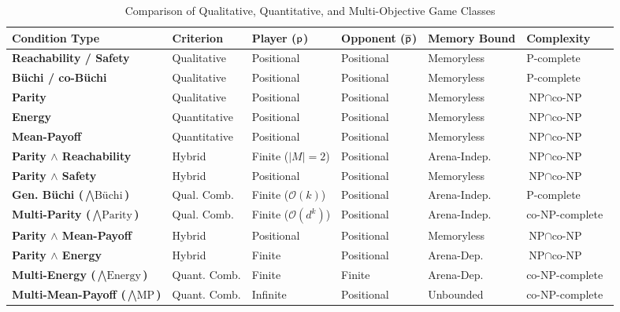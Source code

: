 \documentclass{article}
\begin{document}
\begin{table}[t]
\centering
\caption{Comparison of Qualitative, Quantitative, and Multi-Objective Game Classes}
\label{tab:game_conditions_comparison}
\small
\setlength{\tabcolsep}{1pt}
\begin{tabular}{@{}llllll@{}}
\toprule
\textbf{Condition Type} & \textbf{Criterion} & \textbf{Player ($\mathsf{p}$)} & \textbf{Opponent ($\overline{\mathsf{p}}$)} & \textbf{Memory Bound} & \textbf{Complexity} \\ 
\midrule
\textbf{Reachability / Safety} & Qualitative & Positional & Positional & Memoryless & $\text{P}$-complete \\
\textbf{Büchi / co-Büchi} & Qualitative & Positional & Positional & Memoryless & $\text{P}$-complete \\
\textbf{Parity} & Qualitative & Positional & Positional & Memoryless & $\text{NP} \cap \text{co-NP}$ \\
\textbf{Energy} & Quantitative & Positional & Positional & Memoryless & $\text{NP} \cap \text{co-NP}$~\cite{Chatterjee:2010EP} \\
\textbf{Mean-Payoff} & Quantitative & Positional & Positional & Memoryless & $\text{NP} \cap \text{co-NP}$~\cite{ChatterjeeHJ05} \\ 

\midrule
\textbf{Parity $\land$ Reachability} & Hybrid & Finite ($|M|=2$) & Positional & Arena-Indep. & $\text{NP} \cap \text{co-NP}$ \\
\textbf{Parity $\land$ Safety}       & Hybrid & Positional        & Positional & Memoryless   & $\text{NP} \cap \text{co-NP}$ \\
\textbf{Gen. Büchi ($\bigwedge \text{Büchi}$)} & Qual. Comb. & Finite ($\mathcal{O}(k)$) & Positional & Arena-Indep.~\cite{Bouyer:2022} & $\text{P}$-complete \\
\textbf{Multi-Parity ($\bigwedge \text{Parity}$)} & Qual. Comb. & Finite ($\mathcal{O}(d^k)$) & Positional & Arena-Indep.~\cite{Bouyer:2022} & $\text{co-NP}$-complete \\
\textbf{Parity $\land$ Mean-Payoff} & Hybrid & Positional & Positional & Memoryless & $\text{NP} \cap \text{co-NP}$~\cite{ChatterjeeHJ05} \\
\textbf{Parity $\land$ Energy} & Hybrid & Finite & Positional & Arena-Dep. & $\text{NP} \cap \text{co-NP}$~\cite{Chatterjee:2010EP} \\
\textbf{Multi-Energy ($\bigwedge \text{Energy}$)} & Quant. Comb. & Finite & Finite & Arena-Dep. & $\text{co-NP}$-complete~\cite{Velner:2015} \\
\textbf{Multi-Mean-Payoff ($\bigwedge \text{MP}$)} & Quant. Comb. & Infinite & Positional & Unbounded & $\text{co-NP}$-complete~\cite{Velner:2015} \\ 
\bottomrule
\end{tabular}

\end{table}
\end{document}
